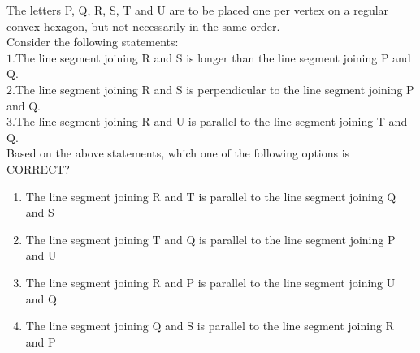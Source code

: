 \item{
The letters P, Q, R, S, T and U are to be placed one per vertex on a regular convex hexagon, but not necessarily in the same order.\\
Consider the following statements:\\
$1$.The line segment joining R and S is longer than the line segment joining P and Q.\\
$2$.The line segment joining R and S is perpendicular to the line segment joining P and Q.\\
$3$.The line segment joining R and U is parallel to the line segment joining T and Q.\\
Based on the above statements, which one of the following options is
CORRECT?
\begin{enumerate}
\item The line segment joining R and T is parallel to the line segment joining Q and S
\item The line segment joining T and Q is parallel to the line segment joining P and U
\item The line segment joining R and P is parallel to the line segment joining U and Q
\item The line segment joining Q and S is parallel to the line segment joining R and P
\end{enumerate}
}
